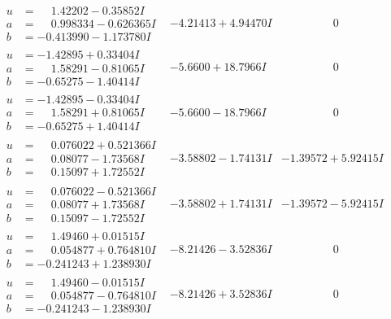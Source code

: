 \documentclass[1p]{elsarticle_modified}
\theoremstyle{definition}
\begin{document}
$$\begin{array}{c|c|c}
\begin{aligned}
u &= \phantom{-}1.42202 - 0.35852 I \\
a &= \phantom{-}0.998334 - 0.626365 I \\
b &= -0.413990 - 1.173780 I\end{aligned}
 & -4.21413 + 4.94470 I & \phantom{-0.000000 } 0 \\ \hline\begin{aligned}
u &= -1.42895 + 0.33404 I \\
a &= \phantom{-}1.58291 - 0.81065 I \\
b &= -0.65275 - 1.40414 I\end{aligned}
 & -5.6600 + 18.7966 I & \phantom{-0.000000 } 0 \\ \hline\begin{aligned}
u &= -1.42895 - 0.33404 I \\
a &= \phantom{-}1.58291 + 0.81065 I \\
b &= -0.65275 + 1.40414 I\end{aligned}
 & -5.6600 - 18.7966 I & \phantom{-0.000000 } 0 \\ \hline\begin{aligned}
u &= \phantom{-}0.076022 + 0.521366 I \\
a &= \phantom{-}0.08077 - 1.73568 I \\
b &= \phantom{-}0.15097 + 1.72552 I\end{aligned}
 & -3.58802 - 1.74131 I & -1.39572 + 5.92415 I \\ \hline\begin{aligned}
u &= \phantom{-}0.076022 - 0.521366 I \\
a &= \phantom{-}0.08077 + 1.73568 I \\
b &= \phantom{-}0.15097 - 1.72552 I\end{aligned}
 & -3.58802 + 1.74131 I & -1.39572 - 5.92415 I \\ \hline\begin{aligned}
u &= \phantom{-}1.49460 + 0.01515 I \\
a &= \phantom{-}0.054877 + 0.764810 I \\
b &= -0.241243 + 1.238930 I\end{aligned}
 & -8.21426 - 3.52836 I & \phantom{-0.000000 } 0 \\ \hline\begin{aligned}
u &= \phantom{-}1.49460 - 0.01515 I \\
a &= \phantom{-}0.054877 - 0.764810 I \\
b &= -0.241243 - 1.238930 I\end{aligned}
 & -8.21426 + 3.52836 I & \phantom{-0.000000 } 0\\

\end{array}$$
\end{document}
